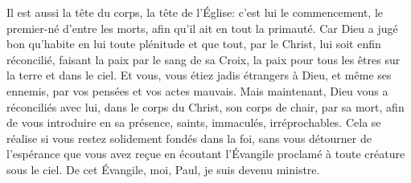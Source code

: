 Il est aussi la tête du corps, la tête de l’Église:
	c’est lui le commencement, le premier-né d’entre les morts,
	afin qu’il ait en tout la primauté.
Car Dieu a jugé bon qu’habite en lui toute plénitude
	et que tout, par le Christ, lui soit enfin réconcilié,
	faisant la paix par le sang de sa Croix,
	la paix pour tous les êtres sur la terre et dans le ciel.
Et vous, vous étiez jadis étrangers à Dieu,
	et même ses ennemis, par vos pensées et vos actes mauvais.
Mais maintenant, Dieu vous a réconciliés avec lui,
	dans le corps du Christ, son corps de chair,
	par sa mort, afin de vous introduire en sa présence,
	saints, immaculés, irréprochables.
Cela se réalise si vous restez solidement fondés dans la foi,
	sans vous détourner de l’espérance que vous avez reçue
		en écoutant l’Évangile proclamé à toute créature sous le ciel.
De cet Évangile, moi, Paul, je suis devenu ministre.
